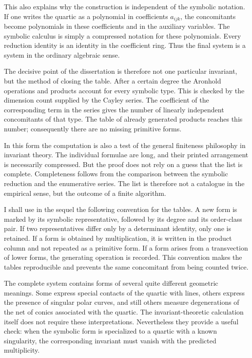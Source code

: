 \documentclass[12pt]{article}
\begin{document}
This also explains why the construction is independent of the symbolic notation. If one writes the
quartic as a polynomial in coefficients \(a_{ijk}\), the concomitants become polynomials in these
coefficients and in the auxiliary variables. The symbolic calculus is simply a compressed notation
for these polynomials. Every reduction identity is an identity in the coefficient ring. Thus the
final system is a system in the ordinary algebraic sense.


The decisive point of the dissertation is therefore not one particular invariant, but the method of
closing the table. After a certain degree the Aronhold operations and products account for every
symbolic type. This is checked by the dimension count supplied by the Cayley series. The coefficient
of the corresponding term in the series gives the number of linearly independent concomitants of
that type. The table of already generated products reaches this number; consequently there are no
missing primitive forms.


In this form the computation is also a test of the general finiteness philosophy in invariant
theory. The individual formulae are long, and their printed arrangement is necessarily compressed.
But the proof does not rely on a guess that the list is complete. Completeness follows from the
comparison between the symbolic reduction and the enumerative series. The list is therefore not a
catalogue in the empirical sense, but the outcome of a finite algorithm.


I shall use in the sequel the following convention for the tables. A new form is marked by its
symbolic representative, followed by its degree and its order-class pair. If two representatives
differ only by a determinant identity, only one is retained. If a form is obtained by
multiplication, it is written in the product column and not repeated as a primitive form. If a form
arises from a transvection of lower forms, the generating operation is recorded. This convention
makes the tables reproducible and prevents the same concomitant from being counted twice.


The complete system contains forms of several quite different geometric meanings. Some express
special contacts of the quartic with lines, others express the presence of singular polar curves,
and still others measure degenerations of the net of conics associated with the quartic. The
invariant-theoretic calculation itself does not require these interpretations. Nevertheless they
provide a useful check: when the symbolic form is specialized to a quartic with a known singularity,
the corresponding invariant must vanish with the predicted multiplicity.
\end{document}
